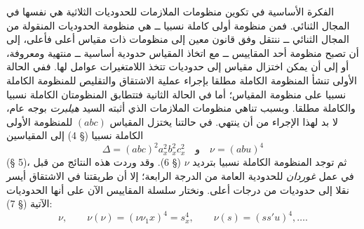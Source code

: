 \documentclass[11pt]{article}
\begin{document}
الفكرة الأساسية في تكوين منظومات الملازمات للحدوديات الثلاثية هي نفسها في المجال الثنائي. فمن منظومة أولى كاملة نسبيا ــ هي منظومة الحدوديات المنقولة من المجال الثنائي ــ ننتقل وفق قانون معين إلى منظومات ذات مقياس أعلى فأعلى، إلى أن تصبح منظومة أحد المقاييس ــ مع اتخاذ المقياس حدودية أساسية ــ منتهية ومعروفة، أو إلى أن يمكن اختزال مقياس إلى حدوديات تتخذ اللامتغيرات عوامل لها. ففي الحالة الأولى تنشأ المنظومة الكاملة مطلقا بإجراء عملية الاشتقاق والتقليص للمنظومة الكاملة نسبيا على منظومة المقياس؛ أما في الحالة الثانية فتتطابق المنظومتان الكاملة نسبيا والكاملة مطلقا. وبسبب تناهي منظومات الملازمات الذي أثبته السيد \emph{هيلبرت} بوجه عام، لا بد لهذا الإجراء من أن ينتهي.
في حالتنا يختزل المقياس $(abc)$ للمنظومة الأولى الكاملة نسبيا (§ 4) إلى المقياسين
\[
\Delta=(abc)^2a_x^2b_x^2c_x^2\quad\text{و}\quad \nu=(abu)^4
\]
(§ 5)، ثم توجد المنظومة الكاملة نسبيا بترديد $\nu$ (§ 6). وقد وردت هذه النتائج من قبل في عمل \emph{غوردان} للحدودية العامة من الدرجة الرابعة؛ إلا أن طريقتنا في الاشتقاق أيسر نقلا إلى حدوديات من درجات أعلى.
ونختار سلسلة المقاييس الآن على أنها الحدوديات الآتية (§ 7):
\[
\nu,\qquad \nu(\nu)=(\nu\nu_1x)^4=s_x^4,\qquad \nu(s)=(ss'u)^4,\ldots .
\]
\end{document}
